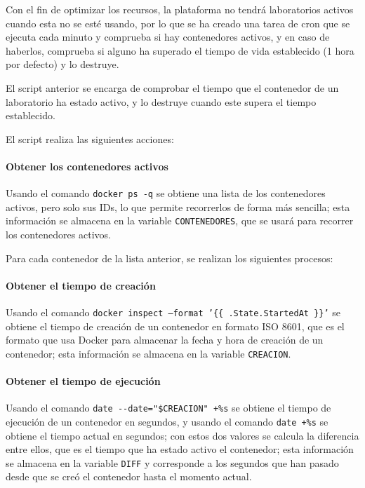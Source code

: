             \newpage

            Con el fin de optimizar los recursos, la plataforma no tendrá laboratorios activos cuando esta no se esté usando, por lo que se ha creado una tarea de cron que se ejecuta cada minuto y comprueba si hay contenedores activos, y en caso de haberlos, comprueba si alguno ha superado el tiempo de vida establecido (1 hora por defecto) y lo destruye.

            El script anterior se encarga de comprobar el tiempo que el contenedor de un laboratorio ha estado activo, y lo destruye cuando este supera el tiempo establecido.
        
            El script realiza las siguientes acciones:

            \paragraph{Obtener los contenedores activos}
            
                Usando el comando \texttt{docker ps -q} se obtiene una lista de los contenedores activos, pero solo sus IDs, lo que permite recorrerlos de forma más sencilla; esta información se almacena en la variable \texttt{CONTENEDORES}, que se usará para recorrer los contenedores activos.

            Para cada contenedor de la lista anterior, se realizan los siguientes procesos:

            \paragraph{Obtener el tiempo de creación}
            
                Usando el comando \texttt{docker inspect --format '\{\{ .State.StartedAt \}\}'} se obtiene el tiempo de creación de un contenedor en formato ISO 8601, que es el formato que usa Docker para almacenar la fecha y hora de creación de un contenedor; esta información se almacena en la variable \texttt{CREACION}.

            \paragraph{Obtener el tiempo de ejecución}
            
                Usando el comando \verb|date --date="$CREACION" +%s| se obtiene el tiempo de ejecución de un contenedor en segundos, y usando el comando \verb|date +%s| se obtiene el tiempo actual en segundos; con estos dos valores se calcula la diferencia entre ellos, que es el tiempo que ha estado activo el contenedor; esta información se almacena en la variable \texttt{DIFF} y corresponde a los segundos que han pasado desde que se creó el contenedor hasta el momento actual.


